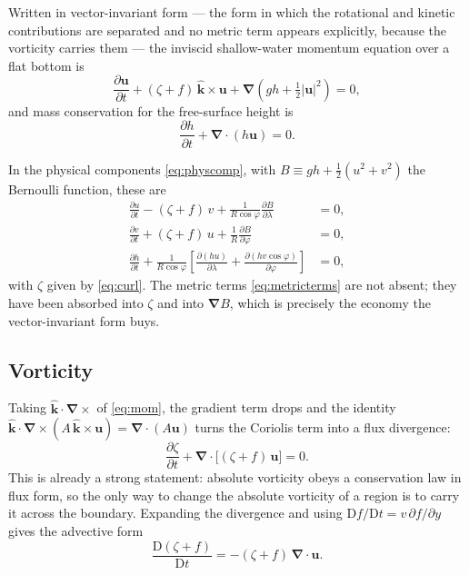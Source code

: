 \documentclass[11pt,a4paper]{article}
\newcommand{\D}{\mathrm{D}}
\newcommand{\uvec}{\boldsymbol{u}}
\newcommand{\kvec}{\hat{\boldsymbol{k}}}
\newcommand{\grad}{\boldsymbol{\nabla}}
\begin{document}
Written in vector-invariant form --- the form in which the rotational and
kinetic contributions are separated and no metric term appears explicitly,
because the vorticity carries them --- the inviscid shallow-water momentum
equation over a flat bottom is
%
\begin{equation}
\frac{\partial\uvec}{\partial t}
 + (\zeta + f)\,\kvec\times\uvec
 + \grad\!\left(g h + \tfrac12|\uvec|^2\right) = 0 ,
\label{eq:mom}
\end{equation}
%
and mass conservation for the free-surface height is
%
\begin{equation}
\frac{\partial h}{\partial t} + \grad\!\cdot(h\uvec) = 0 .
\label{eq:cont}
\end{equation}

In the physical components \eqref{eq:physcomp}, with
$B \equiv g h + \tfrac12(u^2+v^2)$ the Bernoulli function, these are
%
\begin{align}
\frac{\partial u}{\partial t} - (\zeta+f)\,v
  + \frac{1}{R\cos\varphi}\frac{\partial B}{\partial\lambda} &= 0 ,
\label{eq:momu}\\
\frac{\partial v}{\partial t} + (\zeta+f)\,u
  + \frac{1}{R}\frac{\partial B}{\partial\varphi} &= 0 ,
\label{eq:momv}\\
\frac{\partial h}{\partial t} + \frac{1}{R\cos\varphi}
  \left[\frac{\partial (h u)}{\partial\lambda}
      + \frac{\partial (h v\cos\varphi)}{\partial\varphi}\right] &= 0 ,
\label{eq:conth}
\end{align}
%
with $\zeta$ given by \eqref{eq:curl}. The metric terms
\eqref{eq:metricterms} are not absent; they have been absorbed into $\zeta$ and
into $\grad B$, which is precisely the economy the vector-invariant form buys.

\subsection{Vorticity}

Taking $\kvec\cdot\grad\times$ of \eqref{eq:mom}, the gradient term drops and the
identity $\kvec\cdot\grad\times(A\,\kvec\times\uvec) = \grad\!\cdot(A\uvec)$
turns the Coriolis term into a flux divergence:
%
\begin{equation}
\frac{\partial \zeta}{\partial t}
 + \grad\!\cdot\big[(\zeta+f)\,\uvec\big] = 0 .
\label{eq:vort}
\end{equation}
%
This is already a strong statement: absolute vorticity obeys a conservation law
in flux form, so the only way to change the absolute vorticity of a region is to
carry it across the boundary. Expanding the divergence and using
$\D f/\D t = v\,\partial f/\partial y$ gives the advective form
%
\begin{equation}
\frac{\D(\zeta+f)}{\D t} = -(\zeta+f)\,\grad\!\cdot\uvec .
\label{eq:vortadv}
\end{equation}
\end{document}
